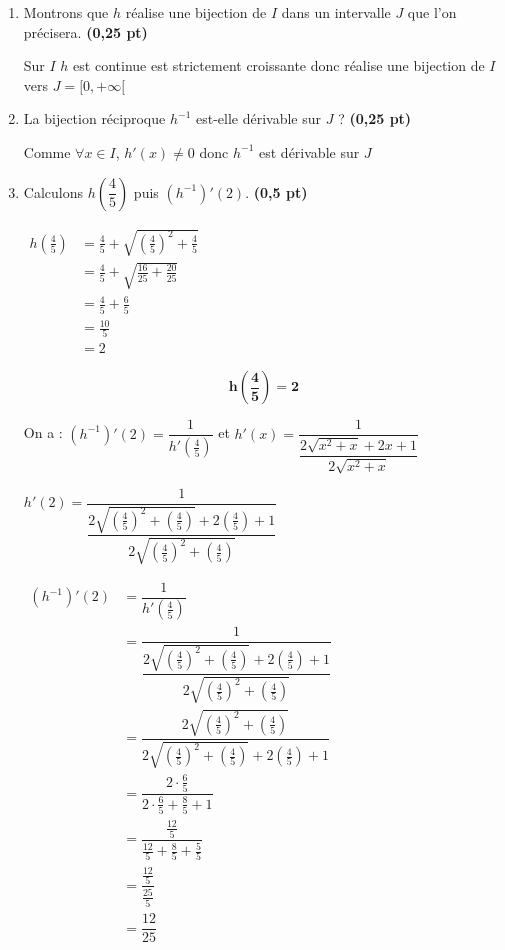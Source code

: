 \documentclass[12pt,a4paper]{article}
\begin{document}
\begin{enumerate}

    \item Montrons que $h$ réalise une bijection de $I$ dans un intervalle $J$ que l'on  précisera.
    \hspace{1cm} \textbf{(0,25 pt)}
    
    Sur $I$ $h$ est continue est strictement croissante donc réalise une bijection de $I$ vers $J=[0,+\infty[$

    \item La bijection réciproque $h^{-1}$ est-elle dérivable sur $J$ ?
    \hspace{1cm} \textbf{(0,25 pt)}

		Comme $\forall x \in I$, $h'(x)\neq 0$ donc $h^{-1}$ est dérivable sur $J$

    \item Calculons $h\!\left(\dfrac{4}{5}\right)$ puis $(h^{-1})'(2)$.
   \hspace{1cm} \textbf{(0,5 pt)}

\(
\begin{aligned}
h\!\left(\frac{4}{5}\right)
&= \frac{4}{5} + \sqrt{\left(\frac{4}{5}\right)^2 + \frac{4}{5}}\\
&= \frac{4}{5} + \sqrt{\frac{16}{25} + \frac{20}{25}}\\
&= \frac{4}{5} + \frac{6}{5}\\
&= \frac{10}{5}\\
&= 2
\end{aligned}
\)

\begin{resultbox}
    \[
        \mathbf{h\!\left(\frac{4}{5}\right)=2}
    \]
\end{resultbox}

On a : $(h^{-1})'(2) = \dfrac{1}{h'\left(\frac{4}{5}\right)}$ et $h'(x)=\dfrac{1}{\dfrac{2\sqrt{x^2+x}+2x+1}{2\sqrt{x^2+x}}}$

$h'(2)=\dfrac{1}{\dfrac{2\sqrt{\left(\frac{4}{5}\right)^2+\left(\frac{4}{5}\right)}+2\left(\frac{4}{5}\right)+1}{2\sqrt{\left(\frac{4}{5}\right)^2+\left(\frac{4}{5}\right)}}}$

\(
\begin{aligned}
(h^{-1})'(2)
&= \dfrac{1}{h'\!\left(\frac{4}{5}\right)}\\[0.2cm]
&=\dfrac{1}{\dfrac{2\sqrt{\left(\frac{4}{5}\right)^2+\left(\frac{4}{5}\right)}+2\left(\frac{4}{5}\right)+1}{2\sqrt{\left(\frac{4}{5}\right)^2+\left(\frac{4}{5}\right)}}}\\[0.2cm]
&=\dfrac{2\sqrt{\left(\frac{4}{5}\right)^2+\left(\frac{4}{5}\right)}}
       {2\sqrt{\left(\frac{4}{5}\right)^2+\left(\frac{4}{5}\right)}+2\left(\frac{4}{5}\right)+1}\\[0.2cm]
&=\dfrac{2\cdot \frac{6}{5}}{2\cdot \frac{6}{5} + \frac{8}{5} + 1}\\[0.2cm]
&=\dfrac{\frac{12}{5}}{\frac{12}{5}+\frac{8}{5}+\frac{5}{5}}\\[0.2cm]
&=\dfrac{\frac{12}{5}}{\frac{25}{5}}\\[0.2cm]
&=\dfrac{12}{25}
\end{aligned}
\)



\end{enumerate}
\end{document}
